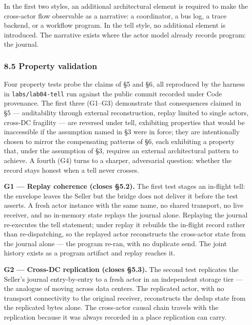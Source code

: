 \documentclass[
]{article}
\let\origtexttt\texttt%
\renewcommand{\texttt}[1]{\origtexttt{\seqsplit{#1}}}%
\let\texttt\origtexttt%
\begin{document}
In the first two styles, an additional architectural element is required
to make the cross-actor flow observable as a narrative: a coordinator, a
bus log, a trace backend, or a workflow program. In the tell style, no
additional element is introduced. The narrative exists where the actor
model already records program: the journal.

\subsubsection{8.5 Property validation}\label{property-validation}

Four property tests probe the claims of §5 and §6, all reproduced by the
harness in \texttt{labs/lab04-tell} run against the public commit
recorded under Code provenance. The first three (G1--G3) demonstrate
that consequences claimed in §5 --- auditability through external
reconstruction, replay limited to single actors, cross-DC fragility ---
are reversed under tell, exhibiting properties that would be
inaccessible if the assumption named in §3 were in force; they are
intentionally chosen to mirror the compensating patterns of §6, each
exhibiting a property that, under the assumption of §3, requires an
external architectural pattern to achieve. A fourth (G4) turns to a
sharper, adversarial question: whether the record stays honest when a
tell never crosses.

\textbf{G1 --- Replay coherence (closes §5.2).} The first test stages an
in-flight tell: the envelope leaves the Seller but the bridge does not
deliver it before the test asserts. A fresh actor instance with the same
name, no shared transport, no live receiver, and no in-memory state
replays the journal alone. Replaying the journal re-executes the tell
statement; under replay it rebuilds the in-flight record rather than
re-dispatching, so the replayed actor reconstructs the cross-actor state
from the journal alone --- the program re-ran, with no duplicate send.
The joint history exists as a program artifact and replay reaches it.

\textbf{G2 --- Cross-DC replication (closes §5.3).} The second test
replicates the Seller's journal entry-by-entry to a fresh actor in an
independent storage tier --- the analogue of moving across data centers.
The replicated actor, with no transport connectivity to the original
receiver, reconstructs the dedup state from the replicated bytes alone.
The cross-actor causal chain travels with the replication because it was
always recorded in a place replication can carry.
\end{document}
